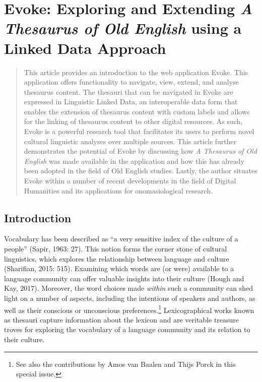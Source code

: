 

\chapter{Evoke: Exploring and Extending \emph{A Thesaurus of Old English} using a Linked Data Approach}

\begin{abstract}
This article provides an introduction to the web application Evoke. This application offers functionality to navigate, view, extend, and analyse thesaurus content. The thesauri that can be navigated in Evoke are expressed in Linguistic Linked Data, an interoperable data form that enables the extension of thesaurus content with custom labels and allows for the linking of thesaurus content to other digital resources. As such, Evoke is a powerful research tool that facilitates its users to perform novel cultural linguistic analyses over multiple sources. This article further demonstrates the potential of Evoke by discussing how \textit{A Thesaurus of Old English} was made available in the application and how this has already been adopted in the field of Old English studies. Lastly, the author situates Evoke within a number of recent developments in the field of Digital Humanities and its applications for onomasiological research.
\end{abstract}


\section{Introduction}
\label{sect:intro}

Vocabulary has been described as “a very sensitive index of the culture of a people” (Sapir, 1963: 27). This notion forms the corner stone of cultural linguistics, which explores the relationship between language and culture (Sharifian, 2015: 515). Examining which words are (or were) available to a language community can offer valuable insights into their culture (Hough and Kay, 2017). Moreover, the word choices made \textit{within} such a community can shed light on a number of aspects, including the intentions of speakers and authors, as well as their conscious or unconscious preferences.\footnote{See also the contributions by Amos van Baalen and Thijs Porck in this special issue.}  Lexicographical works known as thesauri capture information about the lexicon and are veritable treasure troves for exploring the vocabulary of a language community and its relation to their culture.

